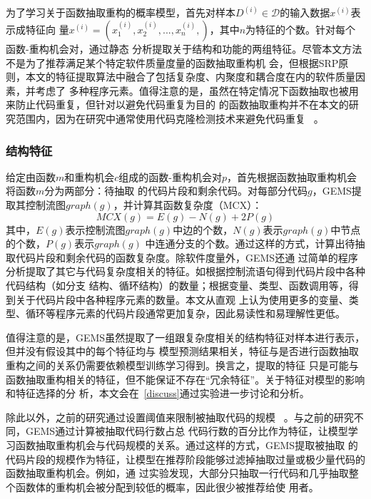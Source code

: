 为了学习关于函数抽取重构的概率模型，首先对样本$D^{(i)}\in\mathcal D$的输入数据$x^{(i)}$表示成特征向
量$x^{(i)}=(x^{(i)}_1,x^{(i)}_2,...,x^{(i)}_n,)$，其中$n$为特征的个数。针对每个函数-重构机会对，通过静态
分析提取关于结构和功能的两组特征。尽管本文方法不是为了推荐满足某个特定软件质量度量的函数抽取重构机
会，但根据SRP原则，本文的特征提取算法中融合了包括复杂度、内聚度和耦合度在内的软件质量因素，并考虑了
多种程序元素。值得注意的是，虽然在特定情况下函数抽取也被用来防止代码重复，但针对以避免代码重复为目的
的函数抽取重构并不在本文的研究范围内，因为在研究中通常使用代码克隆检测技术来避免代码重复
~\cite{bellon2007comparison}。

\subsubsection{结构特征}

给定由函数$m$和重构机会$c$组成的函数-重构机会对$p$，首先根据函数抽取重构机会将函数$m$分为两部分：待抽取
的代码片段和剩余代码。对每部分代码$g$，GEMS提取其控制流图$graph(g)$，并计算其函数复杂度（MCX）：
\begin{equation}
   MCX(g) = E(g) - N(g) + 2P(g)
\end{equation}
其中，$E(g)$表示控制流图$graph(g)$中边的个数，$N(g)$表示$graph(g)$中节点的个数，$P(g)$表示$graph(g)$
中连通分支的个数。通过这样的方式，计算出待抽取代码片段和剩余代码的函数复杂度。除软件度量外，GEMS还通
过简单的程序分析提取了其它与代码复杂度相关的特征。如根据控制流语句得到代码片段中各种代码结构（如分支
结构、循环结构）的数量；根据变量、类型、函数调用等，得到关于代码片段中各种程序元素的数量。本文从直观
上认为使用更多的变量、类型、循环等程序元素的代码片段通常更加复杂，因此易读性和易理解性更低。

值得注意的是，GEMS虽然提取了一组跟复杂度相关的结构特征对样本进行表示，但并没有假设其中的每个特征均与
模型预测结果相关，特征与是否进行函数抽取重构之间的关系仍需要依赖模型训练学习得到。换言之，提取的特征
只是可能与函数抽取重构相关的特征，但不能保证不存在``冗余特征''。关于特征对模型的影响和特征选择的分
析，本文会在~\ref{discuss}通过实验进一步讨论和分析。

除此以外，之前的研究通过设置阈值来限制被抽取代码的规模
~\cite{silva:ICPC14,charalampidou2016identifying}。与之前的研究不同，GEMS通过计算被抽取代码行数占总
代码行数的百分比作为特征，让模型学习函数抽取重构机会与代码规模的关系。通过这样的方式，GEMS提取被抽取
的代码片段的规模作为特征，让模型在推荐阶段能够过滤掉抽取过量或极少量代码的函数抽取重构机会。例如，通
过实验发现，大部分只抽取一行代码和几乎抽取整个函数体的重构机会被分配到较低的概率，因此很少被推荐给使
用者。


